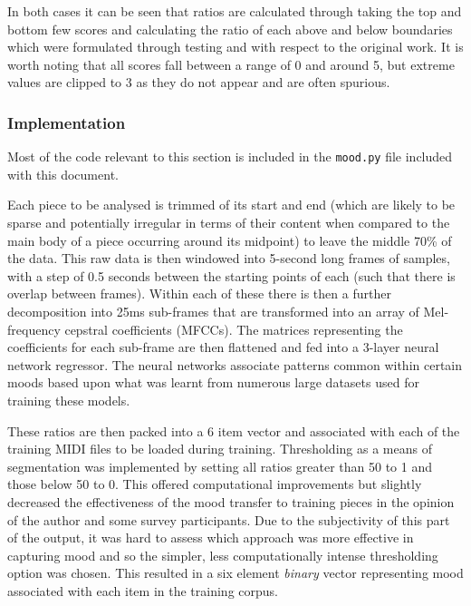 \documentclass[12pt,]{article}
\begin{document}
In both cases it can be seen that ratios are calculated through taking
the top and bottom few scores and calculating the ratio of each above
and below boundaries which were formulated through testing and with
respect to the original work. It is worth noting that all scores fall
between a range of 0 and around 5, but extreme values are clipped to 3
as they do not appear and are often spurious.

\hypertarget{implementation-1}{%
\subsubsection{Implementation}\label{implementation-1}}

Most of the code relevant to this section is included in the
\texttt{mood.py} file included with this document.

Each piece to be analysed is trimmed of its start and end (which are
likely to be sparse and potentially irregular in terms of their content
when compared to the main body of a piece occurring around its midpoint)
to leave the middle 70\% of the data. This raw data is then windowed
into 5-second long frames of samples, with a step of 0.5 seconds between
the starting points of each (such that there is overlap between frames).
Within each of these there is then a further decomposition into 25ms
sub-frames that are transformed into an array of Mel-frequency cepstral
coefficients (MFCCs). The matrices representing the coefficients for
each sub-frame are then flattened and fed into a 3-layer neural network
regressor. The neural networks associate patterns common within certain
moods based upon what was learnt from numerous large datasets used for
training these models.

These ratios are then packed into a 6 item vector and associated with
each of the training MIDI files to be loaded during training.
Thresholding as a means of segmentation was implemented by setting all
ratios greater than 50 to 1 and those below 50 to 0. This offered
computational improvements but slightly decreased the effectiveness of
the mood transfer to training pieces in the opinion of the author and
some survey participants. Due to the subjectivity of this part of the
output, it was hard to assess which approach was more effective in
capturing mood and so the simpler, less computationally intense
thresholding option was chosen. This resulted in a six element
\emph{binary} vector representing mood associated with each item in the
training corpus.
\end{document}
